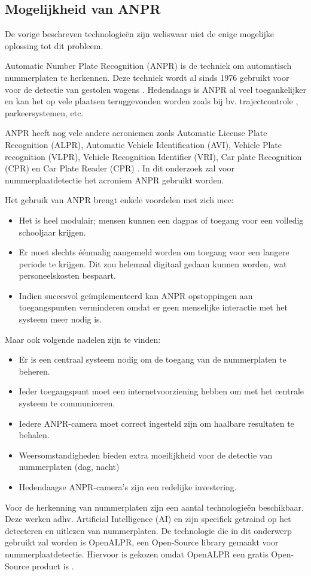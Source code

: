 \subsection{Mogelijkheid van ANPR}
De vorige beschreven technologieën zijn weliswaar niet de enige mogelijke oplossing tot dit probleem.

Automatic Number Plate Recognition (ANPR) is de techniek om automatisch nummerplaten te herkennen. Deze techniek wordt al sinds 1976 gebruikt voor voor de detectie van gestolen wagens \autocite{uk2011anpr}. Hedendaags is ANPR al veel toegankelijker en kan het op vele plaatsen teruggevonden worden zoals bij bv. trajectcontrole \autocite{de2014snelheidscamera}, parkeersystemen, etc.
\par
ANPR heeft nog vele andere acroniemen zoals Automatic License Plate Recognition (ALPR), Automatic Vehicle Identification (AVI), Vehicle Plate recognition (VLPR), Vehicle Recognition Identifier (VRI), Car plate Recognition (CPR) en Car Plate Reader (CPR) \autocite{axis2019license}. In dit onderzoek zal voor nummerplaatdetectie het acroniem ANPR gebruikt worden.
\par
Het gebruik van ANPR brengt enkele voordelen met zich mee:
\begin{itemize}
	\item Het is heel modulair; mensen kunnen een dagpas of toegang voor een volledig schooljaar krijgen.
	\item Er moet slechts éénmalig aangemeld worden om toegang voor een langere periode te krijgen. Dit zou helemaal digitaal gedaan kunnen worden, wat personeelskosten bespaart.
	\item Indien succesvol geïmplementeerd kan ANPR opstoppingen aan toegangspunten verminderen omdat er geen menselijke interactie met het systeem meer nodig is.
\end{itemize}
\par
Maar ook volgende nadelen zijn te vinden:
\begin{itemize}
	\item Er is een centraal systeem nodig om de toegang van de nummerplaten te beheren.
	\item Ieder toegangspunt moet een internetvoorziening hebben om met het centrale systeem te communiceren.
	\item Iedere ANPR-camera moet correct ingesteld zijn om haalbare resultaten te behalen.
	\item Weersomstandigheden bieden extra moeilijkheid voor de detectie van nummerplaten (dag, nacht)
	\item Hedendaagse ANPR-camera's zijn een redelijke investering.
\end{itemize}
\par
Voor de herkenning van nummerplaten zijn een aantal technologieën beschikbaar. Deze werken adhv. Artificial Intelligence (AI) en zijn specifiek getraind op het detecteren en uitlezen van nummerplaten.
De technologie die in dit onderwerp gebruikt zal worden is OpenALPR, een Open-Source library gemaakt voor nummerplaatdetectie. Hiervoor is gekozen omdat OpenALPR een gratis Open-Source product is \autocite{openalprgithub}.


